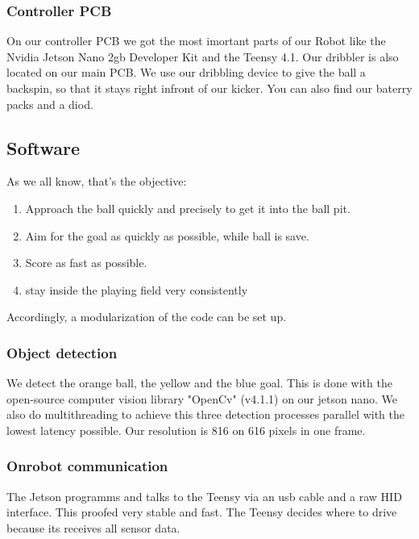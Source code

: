 \documentclass{scrartcl}
\begin{document}
\subsubsection{Controller PCB}

On our controller PCB we got the most imortant parts of our Robot like the Nvidia Jetson Nano 2gb Developer Kit
and the Teensy 4.1. Our dribbler is also located on our main PCB. We use our dribbling device
to give the ball a backspin, so that it stays right infront of our kicker. You can also find our baterry packs
and a diod.

\subsection{Software} %
As we all know, that's the objective:
\begin{enumerate}
    \item{Approach the ball quickly and precisely to get it into the ball pit.}
    \item{Aim for the goal as quickly as possible, while ball is save.}
    \item{Score as fast as possible.}
    \item {stay inside the playing field very consistently}
\end{enumerate}
Accordingly, a modularization of the code can be set up.
\subsubsection{Object detection}
We detect the orange ball, the yellow and the blue goal. This is done with the open-source computer vision library "OpenCv" (v4.1.1)
on our jetson nano. We also do multithreading to achieve this three detection processes parallel with the lowest latency possible.
Our resolution is 816 on 616 pixels in one frame.
\subsubsection{Onrobot communication}
The Jetson programms and talks to the Teensy via an usb cable and a raw HID interface. This proofed very stable and fast. The Teensy decides where
to drive because its receives all sensor data.

\end{document}
